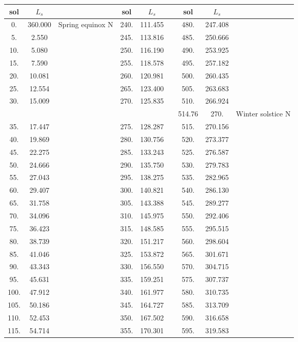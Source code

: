 \hspace*{-2.cm}\begin{tabular}{|c|c|c||c|c|c||c|c|c|}
\hline
 sol & $L_s$ & & sol & $L_s$ & & sol & $L_s$ &  \\
\hline
  0. & 360.000 & Spring equinox N &240. & 111.455& &480. & 247.408&  \\ 
  5. &   2.550 & &245. & 113.816& &485. & 250.666&  \\ 
 10. &   5.080 & &250. & 116.190& &490. & 253.925&  \\ 
 15. &   7.590 & &255. & 118.578& &495. & 257.182&  \\ 
 20. &  10.081 & &260. & 120.981& &500. & 260.435&  \\ 
 25. &  12.554 & &265. & 123.400& &505. & 263.683&  \\ 
 30. &  15.009 & &270. & 125.835& &510. & 266.924&  \\ 
  &  &  & & & &514.76 &   270.& Winter solstice N \\ 
 35. &  17.447 & &275. & 128.287& &515. & 270.156&  \\ 
 40. &  19.869 & &280. & 130.756& &520. & 273.377&  \\ 
 45. &  22.275 & &285. & 133.243& &525. & 276.587&  \\ 
 50. &  24.666 & &290. & 135.750& &530. & 279.783&  \\ 
 55. &  27.043 & &295. & 138.275& &535. & 282.965&  \\ 
 60. &  29.407 & &300. & 140.821& &540. & 286.130&  \\ 
 65. &  31.758 & &305. & 143.388& &545. & 289.277&  \\ 
 70. &  34.096 & &310. & 145.975& &550. & 292.406&  \\ 
 75. &  36.423 & &315. & 148.585& &555. & 295.515&  \\ 
 80. &  38.739 & &320. & 151.217& &560. & 298.604&  \\ 
 85. &  41.046 & &325. & 153.872& &565. & 301.671&  \\ 
 90. &  43.343 & &330. & 156.550& &570. & 304.715&  \\ 
 95. &  45.631 & &335. & 159.251& &575. & 307.737&  \\ 
100. &  47.912 & &340. & 161.977& &580. & 310.735&  \\ 
105. &  50.186 & &345. & 164.727& &585. & 313.709&  \\ 
110. &  52.453 & &350. & 167.502& &590. & 316.658&  \\ 
115. &  54.714 & &355. & 170.301& &595. & 319.583&  \\ 

\end{tabular}
